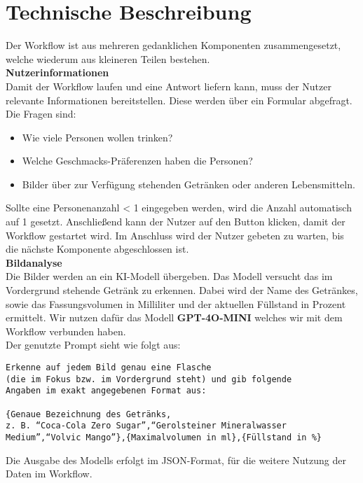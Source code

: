 \section{Technische Beschreibung}\label{sec:descr} %
Der Workflow ist aus mehreren gedanklichen Komponenten zusammengesetzt, welche wiederum aus kleineren Teilen bestehen. \\

\textbf{Nutzerinformationen} \\
Damit der Workflow laufen und eine Antwort liefern kann, muss der Nutzer relevante Informationen bereitstellen.
Diese werden über ein Formular abgefragt. Die Fragen sind:
\begin{itemize}
    \item Wie viele Personen wollen trinken?
    \item Welche Geschmacks-Präferenzen haben die Personen?
    \item Bilder über zur Verfügung stehenden Getränken oder anderen Lebensmitteln.
\end{itemize}

Sollte eine Personenanzahl < 1 eingegeben werden, wird die Anzahl automatisch auf 1 gesetzt.
Anschließend kann der Nutzer auf den Button klicken, damit der Workflow gestartet wird.
Im Anschluss wird der Nutzer gebeten zu warten, bis die nächste Komponente abgeschlossen ist. \\

\textbf{Bildanalyse} \\
Die Bilder werden an ein KI-Modell übergeben. Das Modell versucht das im Vordergrund stehende
Getränk zu erkennen. Dabei wird der Name des Getränkes, sowie das Fassungsvolumen in Milliliter und
der aktuellen Füllstand in Prozent ermittelt. Wir nutzen dafür das Modell \textbf{GPT-4O-MINI}
welches wir mit dem Workflow verbunden haben. \\

Der genutzte Prompt sieht wie folgt aus:
\begin{verbatim}
Erkenne auf jedem Bild genau eine Flasche
(die im Fokus bzw. im Vordergrund steht) und gib folgende
Angaben im exakt angegebenen Format aus:

{Genaue Bezeichnung des Getränks,
z. B. “Coca-Cola Zero Sugar”,“Gerolsteiner Mineralwasser
Medium”,“Volvic Mango”},{Maximalvolumen in ml},{Füllstand in %}
\end{verbatim}

Die Ausgabe des Modells erfolgt im JSON-Format, für die weitere Nutzung der Daten im Workflow. \\

